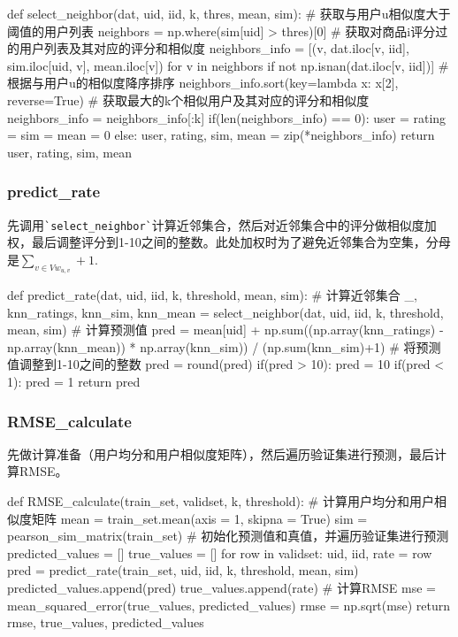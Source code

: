\documentclass[12pt, a4paper]{ctexart}
\begin{document}
\begin{python}
def select_neighbor(dat, uid, iid, k, thres, mean, sim):  
  # 获取与用户u相似度大于阈值的用户列表
  neighbors = np.where(sim[uid] > thres)[0]
  # 获取对商品i评分过的用户列表及其对应的评分和相似度
  neighbors_info = [(v, dat.iloc[v, iid], sim.iloc[uid, v], mean.iloc[v]) for v in neighbors if not np.isnan(dat.iloc[v, iid])]
  # 根据与用户u的相似度降序排序
  neighbors_info.sort(key=lambda x: x[2], reverse=True)
  # 获取最大的k个相似用户及其对应的评分和相似度
  neighbors_info = neighbors_info[:k]
  if(len(neighbors_info) == 0):
    user = rating = sim = mean = 0
  else:
    user, rating, sim, mean = zip(*neighbors_info)
  return user, rating, sim, mean
\end{python}


\subsubsection{predict\_rate}

先调用\verb|`select_neighbor`|计算近邻集合，然后对近邻集合中的评分做相似度加权，最后调整评分到1-10之间的整数。此处加权时为了避免近邻集合为空集，分母是${\sum_{v\in V w_{u,v}}+1}$.

\begin{python}
def predict_rate(dat, uid, iid, k, threshold, mean, sim):
  # 计算近邻集合
  _, knn_ratings, knn_sim, knn_mean = select_neighbor(dat, uid, iid, k, threshold, mean, sim)
  # 计算预测值
  pred = mean[uid] + np.sum((np.array(knn_ratings) - np.array(knn_mean)) * np.array(knn_sim)) / (np.sum(knn_sim)+1)
  # 将预测值调整到1-10之间的整数
  pred = round(pred)
  if(pred > 10):
    pred = 10
  if(pred < 1):
    pred = 1
  return pred
\end{python}


\subsubsection{RMSE\_calculate}

先做计算准备（用户均分和用户相似度矩阵），然后遍历验证集进行预测，最后计算RMSE。

\begin{python}
def RMSE_calculate(train_set, validset, k, threshold):  
  # 计算用户均分和用户相似度矩阵
  mean = train_set.mean(axis = 1, skipna = True)
  sim = pearson_sim_matrix(train_set)
  # 初始化预测值和真值，并遍历验证集进行预测
  predicted_values = []
  true_values = []
  for row in validset:
    uid, iid, rate = row
    pred = predict_rate(train_set, uid, iid, k, threshold, mean, sim)
    predicted_values.append(pred)
    true_values.append(rate)
  # 计算RMSE
  mse = mean_squared_error(true_values, predicted_values)
  rmse = np.sqrt(mse)
  return rmse, true_values, predicted_values
\end{python}
\end{document}

